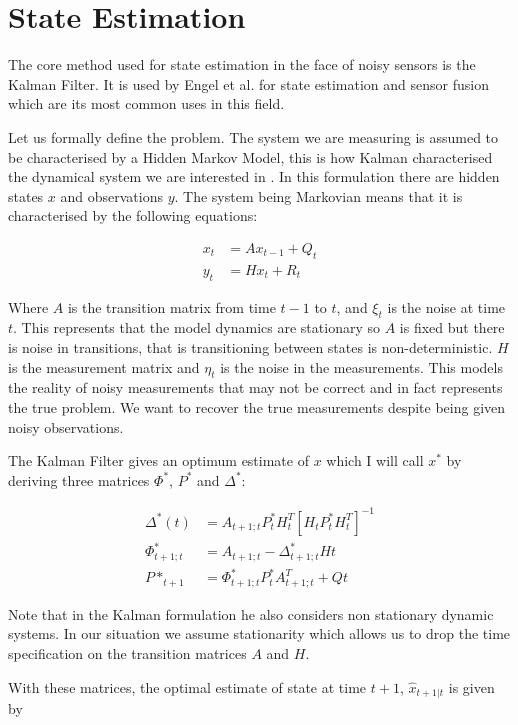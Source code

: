 \documentclass[]{../resources/final_report}
\begin{document}
\pagebreak
\section{State Estimation}

The core method used for state estimation in the face of noisy sensors is the Kalman Filter. It is used by Engel et al.\cite{Engel:Camera-basedNav} for state estimation and sensor fusion which are its most common uses in this field.

Let us formally define the problem. The system we are measuring is assumed to be characterised by a Hidden Markov Model, this is how Kalman characterised the dynamical system we are interested in \cite{Kalman1960ANA}. 
In this formulation there are hidden states $x$ and observations $y$. The system being Markovian means that it is characterised by the following equations:

\begin{align}
  x_t &= Ax_{t-1} + Q_t \\
  y_t &= Hx_t + R_t
\end{align}

Where $A$ is the transition matrix from time $t-1$ to $t$, and $\xi_t$ is the noise at time $t$. This represents that the model dynamics are stationary so $A$ is fixed but there is noise in transitions, that is transitioning between states is non-deterministic.
$H$ is the measurement matrix and $\eta_t$ is the noise in the measurements. This models the reality of noisy measurements that may not be correct and in fact represents the true problem. We want to recover the true measurements despite being given noisy observations.

The Kalman Filter gives an optimum estimate of $x$ which I will call $x^*$ by deriving three matrices $\Phi^*$, $P^*$ and $\Delta^*$:

\begin{align}
  \Delta^*(t) &= A_{t+1;t}P^*_tH^T_t[H_tP^*_tH^T_t]^{-1} \\
  \Phi^*_{t+1;t} &= A_{t+1;t} - \Delta^*_{t+1;t}H{t} \\
  P*_{t+1} &= \Phi^*_{t+1;t}P^*_tA^T_{t+1;t} + Q{t}
\end{align}

Note that in the Kalman formulation he also considers non stationary dynamic systems. In our situation we assume stationarity which allows us to drop the time specification on the transition matrices $A$ and $H$.

With these matrices, the optimal estimate of state at time $t+1$, $\hat{x}_{t+1|t}$ is given by 
\end{document}

